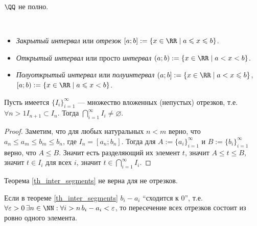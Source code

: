 \documentclass[12pt,a4paper]{article}
\begin{document}
    \begin{corollary*}
        $\QQ$ не полно.
    \end{corollary*}

    \begin{definition}\ 
        \begin{itemize}
            \item \emph{Закрытый интервал} или \emph{отрезок} $[a;b]:=\{x\in\RR \mid a \leqslant x \leqslant b\}$.
            \item \emph{Открытый интервал} или просто \emph{интервал} $(a;b):=\{x\in\RR \mid a < x < b\}$.
            \item \emph{Полуоткрытый интервал} или \emph{полуинтервал} $(a;b] := \{x\in\RR \mid a < x \leqslant b\}$, $[a;b):=\{x\in\RR \mid a \leqslant x < b\}$.
        \end{itemize}
    \end{definition}

    \begin{theorem}\label{th_inter_segments}
        Пусть имеется $\{I_i\}_{i=1}^\infty$ --- множество вложенных (непустых) отрезков, т.е. $\forall n > 1 I_{n+1} \subset I_n$. Тогда $\bigcap_{i=1}^\infty I_i \neq \varnothing$.
    \end{theorem}

    \begin{proof}
        Заметим, что для любых натуральных $n < m$ верно, что $a_n \leqslant a_m \leqslant b_m \leqslant b_n$, где $I_n = [a_n;b_n]$. Тогда для $A:=\{a_i\}_{i=1}^\infty$ и $B:=\{b_i\}_{i=1}^\infty$ верно, что $A \leqslant B$. Значит есть разделяющий их элемент $t$, значит $A \leqslant t \leqslant B$, значит $t\in I_i$ для всех $i$, значит $t \in \bigcap_{i=1}^\infty I_i$.
    \end{proof}

    \begin{remark}
        Теорема \ref{th_inter_segments} не верна для не отрезков.
    \end{remark}

    \begin{remark}
        Если в теореме \ref{th_inter_segments} $b_i-a_i$ ``сходится к 0'', т.е. $\forall \varepsilon > 0\, \exists n\in\NN: \forall i > n\, b_i-a_i < \varepsilon$, то пересечение всех отрезков состоит из ровно одного элемента.
    \end{remark}
\end{document}
